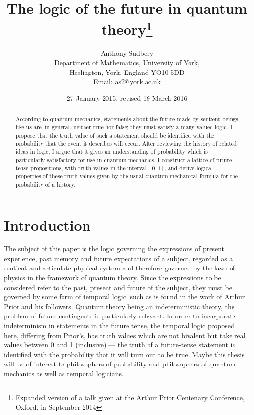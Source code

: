 \documentclass[12pt,reqno]{article}
\renewcommand{\(}{\left(}
\renewcommand{\)}{\right)}
\newcommand{\<}{\langle}
\renewcommand{\>}{\rangle}
\theoremstyle{plain} %
\begin{document}
\title{The logic of the future in quantum theory\footnote{Expanded version of a talk given at the Arthur Prior Centenary Conference, Oxford, in September 2014}}



\author{Anthony Sudbery\\[10pt] \small Department of Mathematics,
    University of York,\\[-2pt] \small Heslington, York, England YO10 5DD\\ 
    \small  Email:  as2@york.ac.uk}
\date{27 January 2015, revised 19 March 2016}





\maketitle



\begin{abstract}
According to quantum mechanics, statements about the future made by sentient beings like us are, in general, neither true nor false; they must satisfy a many-valued logic. I propose that the truth value of such a statement should be identified with the probability that the event it describes will occur. After reviewing the history of related ideas in logic, I argue that it gives an understanding of probability which is particularly satisfactory for use in quantum mechanics. I construct a lattice of 
future-tense propositions, with truth values in the interval $[0,1]$, and derive logical properties of these truth values given by the usual quantum-mechanical formula for the probability of a history.  
\end{abstract}
 
\section{Introduction}
\label{intro}

The subject of this paper is the logic governing the expressions of present experience, past memory and future expectations of a subject, regarded as a sentient and articulate physical system and therefore governed by the laws of physics in the framework of quantum theory. Since the expressions to be considered refer to the past, present and future of the subject, they must be governed by some form of temporal logic, such as is found in the work of Arthur Prior and his followers. Quantum theory being an indeterministic theory, the problem of future contingents is particularly relevant. In order to incorporate indeterminism in statements in the future tense, the temporal logic proposed here, differing from Prior's, has truth values which are not bivalent but take real values between 0 and 1 (inclusive) --- the truth of a future-tense statement is identified with the probability that it will turn out to be true.  Maybe this thesis will be of interest to philosophers of probability and philosophers of quantum mechanics as well as temporal logicians.
\end{document}
